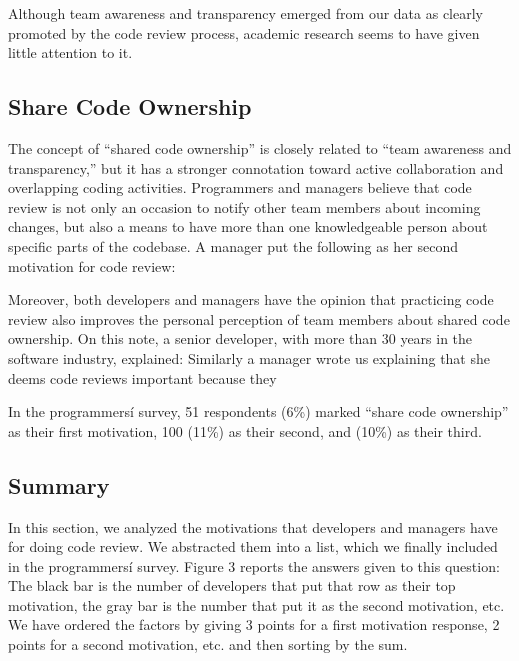 Although team awareness and transparency emerged from our data as clearly
promoted by the code review process, academic research seems to have given
little attention to it. 

\subsection{Share Code Ownership}

The concept of ``shared code ownership'' is closely related to ``team awareness
and transparency,'' but it has a stronger connotation toward active
collaboration and overlapping coding activities. Programmers and managers
believe that code review is not only an occasion to notify other team members
about incoming changes, but also a means to have more than one knowledgeable
person about specific parts of the codebase. A manager put the following as her
second motivation for code review: 

Moreover, both developers and managers have the opinion that practicing code
review also improves the personal perception of team members about shared code
ownership. On this note, a senior developer, with more than 30 years in the
software industry, explained:  Similarly a manager wrote us explaining that she deems code
reviews important because they 

In the programmersí survey, 51 respondents (6\%) marked ``share code
ownership'' as their first motivation, 100 (11\%) as their second, and (10\%)
as their third.

\subsection{Summary}

In this section, we analyzed the motivations that developers and managers have
for doing code review. We abstracted them into a list, which we finally
included in the programmersí survey. Figure 3 reports the answers given to this
question: The black bar is the number of developers that put that row as their
top motivation, the gray bar is the number that put it as the second
motivation, etc. We have ordered the factors by giving 3 points for a first
motivation response, 2 points for a second motivation, etc. and then sorting by
the sum. 

